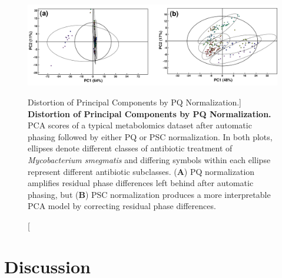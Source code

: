 \begin{figure}[ht!]
\includegraphics[width=6in]{figs/pscorr/05-scores.png}
\caption
      [Distortion of Principal Components by PQ Normalization.]{
  {\bf Distortion of Principal Components by PQ Normalization.}
  \\
  PCA scores of a typical metabolomics dataset after automatic phasing
  followed by either PQ or PSC normalization. In both plots, ellipses denote
  different classes of antibiotic treatment of \emph{Mycobacterium smegmatis}
  and differing symbols within each ellipse represent different antibiotic
  subclasses.
  ({\bf A}) PQ normalization amplifies residual phase differences left behind
  after automatic phasing, but ({\bf B}) PSC normalization produces a more
  interpretable PCA model by correcting residual phase differences.
}
\label{figure.6.5}
\end{figure}

\section{Discussion}

